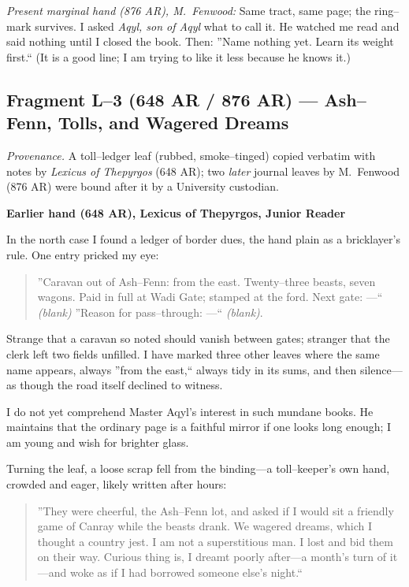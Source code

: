 \documentclass[11pt]{article}
\numberwithin{equation}{section} %
\theoremstyle{plain} %
\theoremstyle{definition} %
\theoremstyle{remark} %
\begin{document}
\medskip
\noindent\textit{Present marginal hand (876 AR), M.\ Fenwood:} Same tract, same page; the ring--mark survives. I asked \textit{Aqyl, son of Aqyl} what to call it. He watched me read and said nothing until I closed the book. Then: ''Name nothing yet. Learn its weight first.`` (It is a good line; I am trying to like it less because he knows it.)

\subsection{Fragment L--3 (648 AR / 876 AR) --- Ash--Fenn, Tolls, and Wagered Dreams}
\label{frag:l3}

\noindent\textit{Provenance.} A toll--ledger leaf (rubbed, smoke--tinged) copied verbatim with notes by \textit{Lexicus of Thepyrgos} (648 AR); two \textit{later} journal leaves by M.\ Fenwood (876 AR) were bound after it by a University custodian.

\medskip
\noindent\textbf{Earlier hand (648 AR), Lexicus of Thepyrgos, Junior Reader}

In the north case I found a ledger of border dues, the hand plain as a bricklayer's rule. One entry pricked my eye:

\begin{quote}\small
''Caravan out of Ash--Fenn: from the east. Twenty--three beasts, seven wagons. Paid in full at Wadi Gate; stamped at the ford. Next gate: ---`` \textit{(blank)} ''Reason for pass--through: ---`` \textit{(blank)}.
\end{quote}

Strange that a caravan so noted should vanish between gates; stranger that the clerk left two fields unfilled. I have marked three other leaves where the same name appears, always ''from the east,`` always tidy in its sums, and then silence---as though the road itself declined to witness.

I do not yet comprehend Master Aqyl's interest in such mundane books. He maintains that the ordinary page is a faithful mirror if one looks long enough; I am young and wish for brighter glass.

Turning the leaf, a loose scrap fell from the binding---a toll--keeper's own hand, crowded and eager, likely written after hours:

\begin{quote}\small
''They were cheerful, the Ash--Fenn lot, and asked if I would sit a friendly game of Canray while the beasts drank. We wagered dreams, which I thought a country jest. I am not a superstitious man. I lost and bid them on their way. Curious thing is, I dreamt poorly after---a month's turn of it---and woke as if I had borrowed someone else's night.``
\end{quote}
\end{document}
